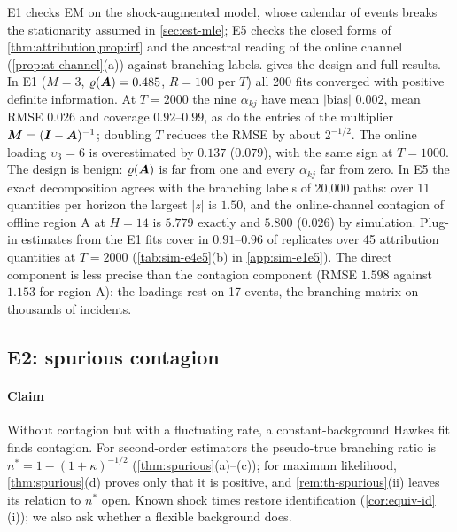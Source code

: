 E1 checks EM on the shock-augmented model, whose calendar of events breaks the
stationarity assumed in \cref{sec:est-mle}; E5 checks the closed forms of
\cref{thm:attribution,prop:irf} and the ancestral reading of the online channel
(\cref{prop:at-channel}(a)) against branching labels.  gives the
design and full results. In E1 ($M=3$, $\varrho(\bm{A})=0.485$,
$R=100$ per $T$) all 200 fits converged with positive definite information. At $T=2000$ the
nine $\alpha_{kj}$ have mean $|$bias$|$ $0.002$, mean RMSE $0.026$ and coverage
$0.92$--$0.99$, as do the entries of the multiplier $\bm{M}=(\bm{I}-\bm{A})^{-1}$; doubling $T$
reduces the RMSE by about $2^{-1/2}$. The online loading $\upsilon_3=6$ is overestimated by
$0.137$ ($0.079$), with the same sign at $T=1000$. The design is benign: $\varrho(\bm{A})$ is far
from one and every $\alpha_{kj}$ far from zero. In E5 the exact decomposition agrees with
the branching labels of 20{,}000 paths: over 11 quantities per horizon the largest $|z|$
is $1.50$, and the online-channel contagion of offline region A at $H=14$ is $5.779$
exactly and $5.800$ ($0.026$) by simulation. Plug-in estimates from the E1 fits cover in
$0.91$--$0.96$ of replicates over 45 attribution quantities at $T=2000$
(\cref{tab:sim-e4e5}(b) in \cref{app:sim-e1e5}). The direct component is less precise than the contagion component
(RMSE $1.598$ against $1.153$ for region A): the loadings rest on 17 events, the branching
matrix on thousands of incidents.

\subsection{E2: spurious contagion}\label{sec:sim-spurious}

\paragraph{Claim} Without contagion but with a fluctuating rate, a constant-background
Hawkes fit finds contagion. For second-order estimators the pseudo-true branching ratio is
$n^*=1-(1+\kappa)^{-1/2}$ (\cref{thm:spurious}(a)--(c)); for maximum likelihood,
\cref{thm:spurious}(d) proves only that it is positive, and \cref{rem:th-spurious}(ii)
leaves its relation to $n^*$ open. Known shock times restore identification
(\cref{cor:equiv-id}(i)); we also ask whether a flexible background does.

